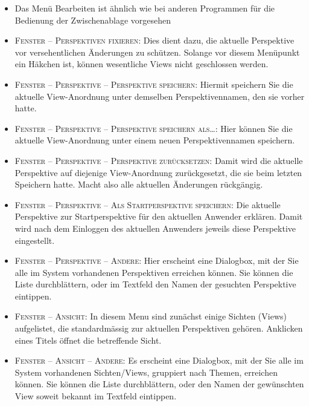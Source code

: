 \begin{itemize}
  \item {Das Menü \glqq Bearbeiten\grqq{} ist ähnlich wie bei anderen Programmen
  für die Bedienung der Zwischenablage vorgesehen}
  \item {\textsc{Fenster -- Perspektiven fixieren}: Dies dient dazu, die
  aktuelle Perspektive vor versehentlichen Änderungen zu schützen. Solange vor
  diesem Menüpunkt ein Häkchen ist, können wesentliche Views nicht geschlossen
  werden.}
  \item {\textsc{Fenster -- Perspektive -- Perspektive speichern}: Hiermit
  speichern Sie die aktuelle View-Anordnung unter demselben Perspektivennamen,
  den sie vorher hatte.}
  \item {\textsc{Fenster -- Perspektive -- Perspektive speichern als\ldots}:
  Hier können Sie die aktuelle View-Anordnung unter einem neuen
  Perspektivennamen speichern.}
  \item {\textsc{Fenster -- Perspektive -- Perspektive zurücksetzen}: Damit wird
  die aktuelle Perspektive auf diejenige View-Anordnung zurückgesetzt, die sie
  beim letzten Speichern hatte. Macht also alle aktuellen Änderungen
  rückgängig.}
  \item {\textsc{Fenster -- Perspektive -- Als Startperspektive speichern}: Die
  aktuelle Perspektive zur Startperspektive für den aktuellen Anwender erklären.
  Damit wird nach dem Einloggen des aktuellen Anwenders jeweils diese
  Perspektive eingestellt.}
  \item {\textsc{Fenster -- Perspektive -- Andere}: Hier erscheint eine
  Dialogbox, mit der Sie alle im System vorhandenen Perspektiven erreichen
  können. Sie können die Liste durchblättern, oder im Textfeld den Namen der
  gesuchten Perspektive eintippen.}
  \item {\textsc{Fenster -- Ansicht}: In diesem Menu sind zunächst einige
  Sichten (Views) aufgelistet, die standardmässig zur aktuellen Perspektiven
  gehören. Anklicken eines Titels öffnet die betreffende Sicht.}
  \item {\textsc{Fenster -- Ansicht -- Andere}: Es erscheint eine Dialogbox, mit
  der Sie alle im System vorhandenen Sichten/Views, gruppiert nach Themen, erreichen
  können. Sie können die Liste durchblättern, oder den Namen der gewünschten
  View soweit bekannt im Textfeld eintippen.}
\end{itemize}

